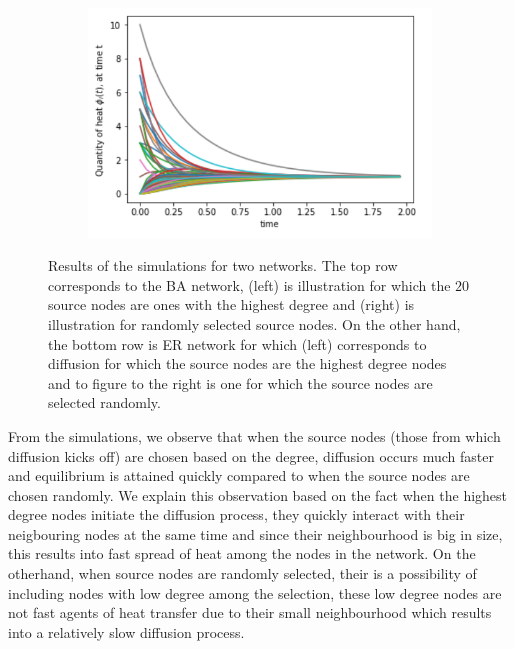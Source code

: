 \documentclass[10pt,a4paper]{article}
\begin{document}
\begin{figure}[H]
\begin{subfigure}[b]{0.45\textwidth}
     		\caption{}
     		\label{}
     	\end{subfigure}~
     	\begin{subfigure}[b]{0.45\textwidth}
     		\includegraphics[width= \textwidth]{images/ER-randomsource.png}
     		\caption{}
     		\label{}
     	\end{subfigure}
     	\caption{ Results of the simulations for two networks. The top row corresponds to the BA network, (left) is illustration for which the $20$ source nodes are ones with the highest degree and (right) is illustration for randomly selected source nodes. On the other hand, the bottom row is ER network for which (left) corresponds to diffusion for which the source nodes are the highest degree nodes and to figure to the right is one for which the source nodes are selected randomly.}
     	\label{sourceimpact}
     \end{figure}
     
     From the simulations, we observe that when the source nodes (those  from which diffusion kicks off) are chosen based on the degree, diffusion occurs much faster and equilibrium is attained quickly compared to when the source nodes are chosen randomly. We explain this observation based on the fact when the highest degree nodes initiate the diffusion process, they quickly interact with their neigbouring nodes at the same time and since their neighbourhood is big in size, this results into fast spread of heat among the nodes in the network. On the otherhand, when source nodes are randomly selected, their is a possibility of including nodes with low degree among the selection, these low degree nodes are not fast agents of heat transfer due to their small neighbourhood which results into a relatively slow diffusion process.
     
\end{document}
